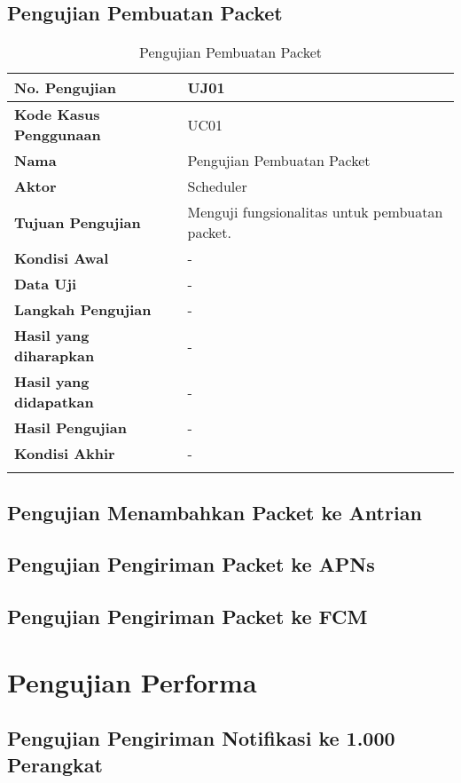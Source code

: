 \subsection{Pengujian Pembuatan Packet}
\begin{longtable}{|p{2.5cm}|p{6.5cm}|}
    \hline
    \textbf{No. Pengujian} & UJ01 \\ \hline
    \textbf{Kode Kasus Penggunaan} & UC01 \\ \hline
    \textbf{Nama} & Pengujian Pembuatan Packet \\ \hline
    \textbf{Aktor} & Scheduler \\ \hline
    \textbf{Tujuan Pengujian} & Menguji fungsionalitas untuk pembuatan packet. \\ \hline
    \textbf{Kondisi Awal} & - \\ \hline
    \textbf{Data Uji} & - \\ \hline
    \textbf{Langkah Pengujian} & - \\ \hline
    \textbf{Hasil yang diharapkan} & - \\ \hline
    \textbf{Hasil yang didapatkan} & - \\ \hline
    \textbf{Hasil Pengujian} & - \\ \hline
    \textbf{Kondisi Akhir} & - \\ \hline
    \caption{Pengujian Pembuatan Packet}
    \label{5:tabel_pengujian_pembuatan_packet}
\end{longtable}

\subsection{Pengujian Menambahkan Packet ke Antrian}

\subsection{Pengujian Pengiriman Packet ke APNs}

\subsection{Pengujian Pengiriman Packet ke FCM}

\section{Pengujian Performa}

\subsection{Pengujian Pengiriman Notifikasi ke 1.000 Perangkat}

